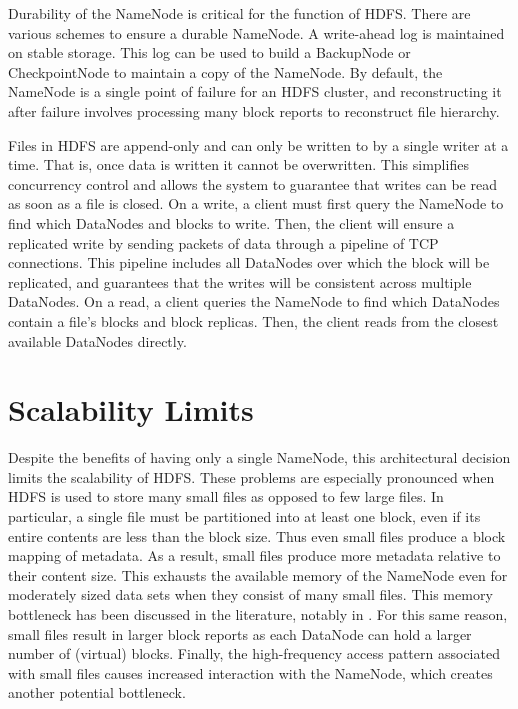 \documentclass[11pt, a4paper]{article}
\begin{document}
\begin{multicols*}{2}
Durability of the NameNode is critical for the function of HDFS. There are various schemes to ensure a durable NameNode. A write-ahead log is maintained on stable storage. This log can be used to build a BackupNode or CheckpointNode to maintain a copy of the NameNode. By default, the NameNode is a single point of failure for an HDFS cluster, and reconstructing it after failure involves processing many block reports to reconstruct file hierarchy.

Files in HDFS are append-only and can only be written to by a single writer at a time. That is, once data is written it cannot be overwritten. This simplifies concurrency control and allows the system to guarantee that writes can be read as soon as a file is closed. On a write, a client must first query the NameNode to find which DataNodes and blocks to write. Then, the client will ensure a replicated write by sending packets of data through a pipeline of TCP connections. This pipeline includes all DataNodes over which the block will be replicated, and guarantees that the writes will be consistent across multiple DataNodes. On a read, a client queries the NameNode to find which DataNodes contain a file's blocks and block replicas. Then, the client reads from the closest available DataNodes directly.

\section{Scalability Limits}\label{ScalabilityLimits}
Despite the benefits of having only a single NameNode, this architectural decision limits the scalability of HDFS. These problems are especially pronounced when HDFS is used to store many small files as opposed to few large files. In particular, a single file must be partitioned into at least one block, even if its entire contents are less than the block size. Thus even small files produce a block mapping of metadata. As a result, small files produce more metadata relative to their content size. This exhausts the available memory of the NameNode even for moderately sized data sets when they consist of many small files. This memory bottleneck has been discussed in the literature, notably in \cite{HdfsScale}. For this same reason, small files result in larger block reports as each DataNode can hold a larger number of (virtual) blocks. Finally, the high-frequency access pattern associated with small files causes increased interaction with the NameNode, which creates another potential bottleneck.


\end{multicols*}
\end{document}
